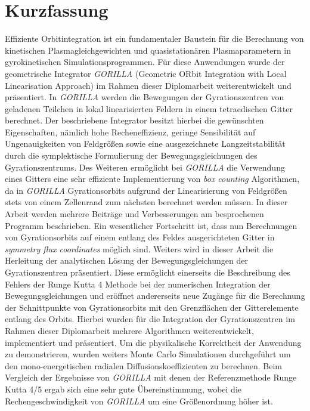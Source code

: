 \documentclass[./main.tex]{subfiles}
\begin{document}
\chapter*{Kurzfassung}
\label{cha:kurzfassung}
Effiziente Orbitintegration ist ein fundamentaler Baustein für die Berechnung von kinetischen Plasmagleichgewichten und quasistationären Plasmaparametern in gyrokinetischen Simulationsprogrammen. Für diese Anwendungen wurde der geometrische Integrator \textit{GORILLA}  (Geometric ORbit Integration with Local Linearisation Approach) im Rahmen dieser Diplomarbeit weiterentwickelt und präsentiert. In \textit{GORILLA} werden die Bewegungen der Gyrationszentren von geladenen Teilchen in lokal linearisierten Feldern in einem tetraedischen Gitter berechnet. Der beschriebene Integrator besitzt hierbei die gewünschten Eigenschaften, nämlich hohe Recheneffizienz, geringe Sensibilität auf Ungenauigkeiten von Feldgrößen sowie eine ausgezeichnete Langzeitstabilität durch die symplektische Formulierung der Bewegungsgleichungen des Gyrationszentrums. Des Weiteren ermöglicht bei \textit{GORILLA} die Verwendung eines Gitters eine sehr effiziente Implementierung von \textit{box counting} Algorithmen, da in \textit{GORILLA} Gyrationsorbits aufgrund der Linearisierung von Feldgrößen stets von einem Zellenrand zum nächsten berechnet werden müssen. In dieser Arbeit werden mehrere Beiträge und Verbesserungen am besprochenen Programm beschrieben. 
Ein wesentlicher Fortschritt ist, dass nun Berechnungen von Gyrationsorbits auf einem entlang des Feldes ausgerichteten Gitter in \textit{symmetry flux coordinates} möglich sind. Weiters wird in dieser Arbeit die Herleitung der analytischen Lösung der Bewegungsgleichungen der Gyrationszentren präsentiert. Diese ermöglicht einerseits die Beschreibung des Fehlers der Runge Kutta 4 Methode bei der numerischen Integration der Bewegungsgleichungen und eröffnet andererseits neue Zugänge für die Berechnung der Schnittpunkte von Gyrationsorbits mit den Grenzflächen der Gitterelemente entlang des Orbits. Hierbei wurden für die Integration der Gyrationszentren im Rahmen dieser Diplomarbeit mehrere Algorithmen weiterentwickelt, implementiert und präsentiert. 
Um die physikalische Korrektheit der Anwendung zu demonstrieren, wurden weiters Monte Carlo Simulationen durchgeführt um den mono-energetischen radialen Diffusionskoeffizienten zu berechnen. Beim Vergleich der Ergebnisse von \textit{GORILLA} mit denen der Referenzmethode Runge Kutta 4/5 ergab sich eine sehr gute Übereinstimmung, wobei die Rechengeschwindigkeit von \textit{GORILLA} um eine Größenordnung höher ist.
\end{document}
